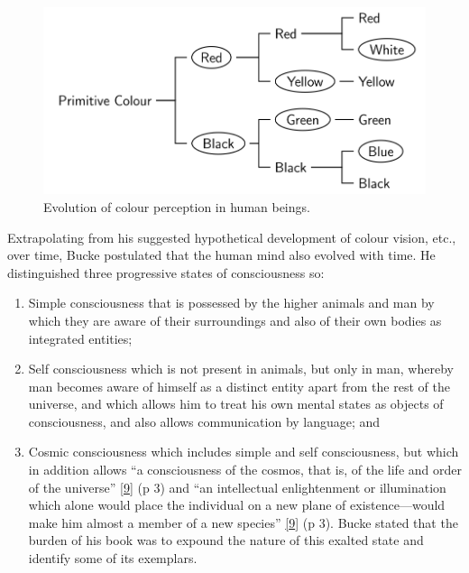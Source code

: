 \documentclass[
  12pt,
  british,
  a4paper,
  rgb,
  dvipsnames,
  svgnames,
  hyphens]{article}
\begin{document}
\begin{figure}
\hypertarget{fig:colour-tree}{%
\centering
\includegraphics[width=1\textwidth,height=\textheight]{images/colour-perception-tree.svg}
\caption[Evolution of colour perception in human beings.]{Evolution of
colour perception in human
beings.\footnotemark{}}\label{fig:colour-tree}
}
\end{figure}

Extrapolating from his suggested hypothetical development of colour
vision, etc., over time, Bucke postulated that the human mind also
evolved with time. He distinguished three progressive states of
consciousness so:

\begin{enumerate}
\item
  Simple consciousness that is possessed by the higher animals and man
  by which they are aware of their surroundings and also of their own
  bodies as integrated entities;
\item
  Self consciousness which is not present in animals, but only in man,
  whereby man becomes aware of himself as a distinct entity apart from
  the rest of the universe, and which allows him to treat his own mental
  states as objects of consciousness, and also allows communication by
  language; and
\item
  Cosmic consciousness which includes simple and self consciousness, but
  which in addition allows ``a consciousness of the cosmos, that is, of
  the life and order of the universe''
  \protect\hyperlink{ref-bucke48}{{[}9{]}} (p 3) and ``an intellectual
  enlightenment or illumination which alone would place the individual
  on a new plane of existence---would make him almost a member of a new
  species'' \protect\hyperlink{ref-bucke48}{{[}9{]}} (p 3). Bucke stated
  that the burden of his book was to expound the nature of this exalted
  state and identify some of its exemplars.
\end{enumerate}
\end{document}
